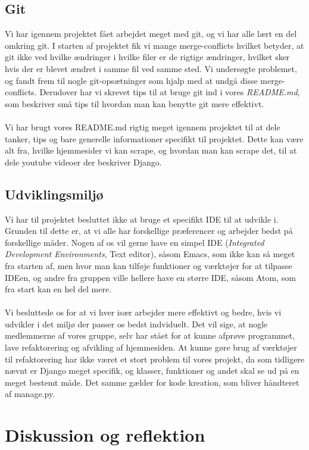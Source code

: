 \documentclass[12pt]{article}
\begin{document}
\subsection{Git}
Vi har igennem projektet fået arbejdet meget med git, og vi har alle lært en del omkring git. I starten af projektet fik vi mange merge-conflicts hvilket betyder, at git ikke ved hvilke ændringer i hvilke filer er de rigtige ændringer, hvilket sker hvis der er blevet ændret i samme fil ved samme sted. Vi undersøgte problemet, og fandt frem til nogle git-opsætninger som hjalp med at undgå disse merge-conflicts. Derudover har vi skrevet tips til at bruge git ind i vores \textit{README.md}, som beskriver små tips til hvordan man kan benytte git mere effektivt. \\ \\
Vi har brugt vores README.md rigtig meget igennem projektet til at dele tanker, tips og bare generelle informationer specifikt til projektet. Dette kan være alt fra, hvilke hjemmesider vi kan scrape, og hvordan man kan scrape det, til at dele youtube videoer der beskriver Django.

\subsection{Udviklingsmiljø}
Vi har til projektet besluttet ikke at bruge et specifikt IDE til at udvikle i. Grunden til dette er, at vi alle har forskellige præferencer og arbejder bedst på forskellige måder. Nogen af os vil gerne have en simpel IDE (\textit{Integrated Development Environments}, Text editor), såsom Emacs, som ikke kan så meget fra starten af, men hvor man kan tilføje funktioner og værktøjer for at tilpasse IDEen, og andre fra gruppen ville hellere have en større IDE, såsom Atom, som fra start kan en hel del mere. \\ \\
Vi besluttede os for at vi hver især arbejder mere effektivt og bedre, hvis vi udvikler i det miljø der passer os bedst indviduelt. Det vil sige, at nogle medlemmerne af vores gruppe, selv har stået for at kunne afprøve programmet, lave refaktorering og afvikling af hjemmesiden. At kunne gøre brug af værktøjer til refaktorering har ikke været et stort problem til vores projekt, da som tidligere nævnt er Django meget specifik, og klasser, funktioner og andet skal se ud på en meget bestemt måde. Det samme gælder for kode kreation, som bliver håndteret af manage.py.

\section{Diskussion og reflektion} %
\label{sec:diskussion}
\end{document}
